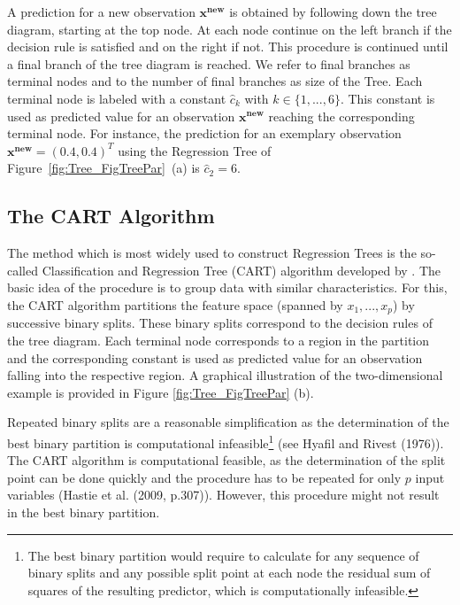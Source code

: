 \noindent
A prediction for a new observation $\mathbf{x^{new}}$ is obtained by following down the tree diagram, starting at the top node. At each node continue on the left branch if the decision rule is satisfied and on the right if not. This procedure is continued until a final branch of the tree diagram is reached. We refer to final branches as terminal nodes and to the number of final branches as size of the Tree. Each terminal node is labeled with a constant $\hat{c}_k$ with $k \in \{1,...,6\}$. This constant is used as predicted value for an observation $\mathbf{x^{new}}$ reaching the corresponding terminal node. For instance, the prediction for an exemplary observation $\mathbf{x^{new}}=(0.4,0.4)^T$ using the Regression Tree of Figure~\ref{fig:Tree_FigTreePar}~(a) is $\hat{c}_2=6$.

\subsection{The CART Algorithm}
The method which is most widely used to construct Regression Trees is the so-called Classification and Regression Tree (CART) algorithm developed by \cite{Breiman1984}. The basic idea of the procedure is to group data with similar characteristics. For this, the CART algorithm partitions the feature space (spanned by $x_1, ..., x_p$) by successive binary splits. These binary splits correspond to the decision rules of the tree diagram. Each terminal node corresponds to a region in the partition and the corresponding constant is used as predicted value for an observation falling into the respective region. A graphical illustration of the two-dimensional example is provided in Figure \ref{fig:Tree_FigTreePar} (b).

Repeated binary splits are a reasonable simplification as the determination of the best binary partition is computational infeasible\footnote{The best binary partition would require to calculate for any sequence of binary splits and any possible split point at each node the residual sum of squares of the resulting predictor, which is computationally infeasible.} (see Hyafil and Rivest (1976)). The CART algorithm is computational feasible, as the determination of the split point can be done quickly and the procedure has to be repeated for only $p$ input variables (Hastie et al. (2009, p.307)). However, this procedure might not result in the best binary partition.\\


